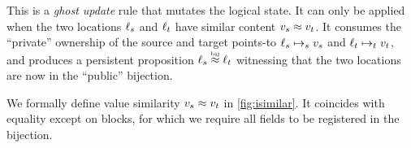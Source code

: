 \begin{mathline}
\end{mathline}
This is a \emph{ghost update} rule that mutates the logical state.
It can only be applied when the two locations $\datalangLoc_s$ and $\datalangLoc_t$ have similar content $\datalangVal_s \iSimilar \datalangVal_t$.
It consumes the ``private'' ownership of the source and target points-to $\datalangLoc_s \iPointsto_s \datalangVal_s$ and $\datalangLoc_t \iPointsto_t \datalangVal_t$, and produces a persistent proposition $\datalangLoc_s \iInBij \datalangLoc_t$ witnessing that the two locations are now in the ``public'' bijection.

We formally define value similarity $\datalangVal_s \iSimilar \datalangVal_t$ in \cref{fig:isimilar}.
It coincides with equality except on blocks, for which we require all fields to be registered in the bijection.



